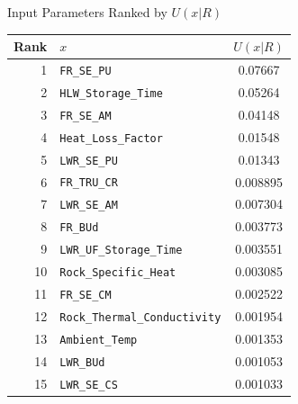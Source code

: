 \documentclass[pdf, autumn, slideColor, nocolorBG]{prosper}
\begin{document}
\begin{slide}{Input Parameters Ranked by $U(x|R)$}
\begin{center}
\tiny
\begin{tabular}{|r|l|c|}
\hline
\textbf{Rank} & \textbf{$x$} & \textbf{$U(x|R)$}\\
\hline
1&\texttt{FR\_SE\_PU}&0.07667\\
\hline
2&\texttt{HLW\_Storage\_Time}&0.05264\\
\hline
3&\texttt{FR\_SE\_AM}&0.04148\\
\hline
4&\texttt{Heat\_Loss\_Factor}&0.01548\\
\hline
5&\texttt{LWR\_SE\_PU}&0.01343\\
\hline
6&\texttt{FR\_TRU\_CR}&0.008895\\
\hline
7&\texttt{LWR\_SE\_AM}&0.007304\\
\hline
8&\texttt{FR\_BUd}&0.003773\\
\hline
9&\texttt{LWR\_UF\_Storage\_Time}&0.003551\\
\hline
10&\texttt{Rock\_Specific\_Heat}&0.003085\\
\hline
11&\texttt{FR\_SE\_CM}&0.002522\\
\hline
12&\texttt{Rock\_Thermal\_Conductivity}&0.001954\\
\hline
13&\texttt{Ambient\_Temp}&0.001353\\
\hline
14&\texttt{LWR\_BUd}&0.001053\\
\hline
15&\texttt{LWR\_SE\_CS}&0.001033\\
\hline
\end{tabular}
\end{center}
\end{slide}
\end{document}
